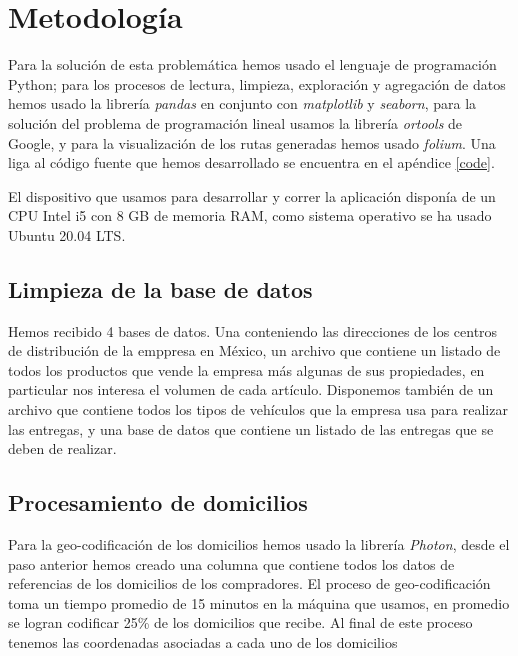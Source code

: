 \documentclass[journal]{IEEEtran}
\begin{document}
    \section{Metodología}
    
        Para la solución de esta problemática hemos usado el lenguaje de programación Python; para los procesos de lectura, limpieza, exploración y agregación de datos hemos usado la librería \emph{pandas} en conjunto con \emph{matplotlib} y \emph{seaborn}, para la solución del problema de programación lineal usamos la librería \emph{ortools} de Google, y para la visualización de los rutas generadas hemos usado \emph{folium}. Una liga al código fuente que hemos desarrollado se encuentra en el apéndice \ref{code}.
        
        El dispositivo que usamos para desarrollar y correr la aplicación disponía de un CPU Intel i5 con 8 GB de memoria RAM, como sistema operativo se ha usado Ubuntu 20.04 LTS.
    
        \subsection{Limpieza de la base de datos} \label{stage 1}
            
            Hemos recibido 4 bases de datos. Una conteniendo las direcciones de los centros de distribución de la emppresa en México, un archivo que contiene un listado de todos los productos que vende la empresa más algunas de sus propiedades, en particular nos interesa el volumen de cada artículo. Disponemos también de un archivo que contiene todos los tipos de vehículos que la empresa usa para realizar las entregas, y una base de datos que contiene un listado de las entregas que se deben de realizar.
            
        \subsection{Procesamiento de domicilios} \label{stage 2}
        
            Para la geo-codificación de los domicilios hemos usado la librería \emph{Photon}, desde el paso anterior hemos creado una columna que contiene todos los datos de referencias de los domicilios de los compradores. El proceso de geo-codificación toma un tiempo promedio de 15 minutos en la máquina que usamos, en promedio se logran codificar 25\% de los domicilios que recibe. Al final de este proceso tenemos las coordenadas asociadas a cada uno de los domicilios
\end{document}
